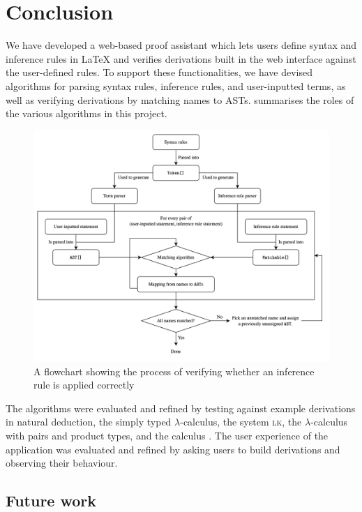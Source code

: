 \chapter{Conclusion}
We have developed a web-based proof assistant which lets users define syntax and inference rules in \LaTeX{} and verifies derivations built in the web interface against the user-defined rules. To support these functionalities, we have devised algorithms for parsing syntax rules, inference rules, and user-inputted terms, as well as verifying derivations by matching names to ASTs.  summarises the roles of the various algorithms in this project.

\begin{figure}[!htbp]
    \centering
    \includegraphics[width=\textwidth]{conclusion/flowchart.png}
    \caption{A flowchart showing the process of verifying whether an inference rule is applied correctly}
    \label{fig:conclusion:flowchart}
\end{figure}

The algorithms were evaluated and refined by testing against example derivations in natural deduction, the simply typed $\lambda$-calculus, the system \textsc{lk}, the $\lambda$-calculus with pairs and product types, and the calculus \lbm. The user experience of the application was evaluated and refined by asking users to build derivations and observing their behaviour.

\section{Future work}
